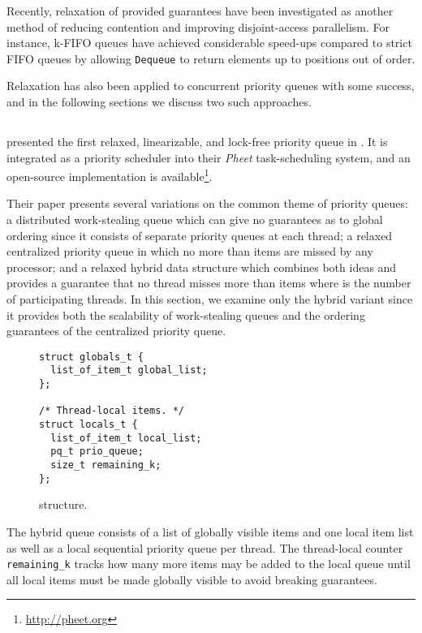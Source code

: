 \documentclass[a4paper,10pt]{article}
\begin{document}
Recently, relaxation of provided guarantees have been investigated as another method of reducing
contention and improving disjoint-access parallelism.
For instance, k-FIFO queues \cite{kirsch2012fast} have achieved considerable
speed-ups compared to strict FIFO queues by allowing {\lstset{breaklines,breakatwhitespace} \lstinline|Dequeue|} to return elements
up to  positions out of order.

Relaxation has also been applied to concurrent priority queues with some success, and in the following
sections we discuss two such approaches.

\subsection{\citeauthor{wimmer2013data}} \label{sec:wimmer}

\citeauthor{wimmer2013data} presented the first relaxed, linearizable, and lock-free priority queue
in \cite{wimmer2013data}. It is integrated as a priority scheduler into their \emph{Pheet} task-scheduling
system, and an open-source implementation is available\footnote{\url{http://pheet.org}}.

Their paper presents several variations on the common theme of priority queues: a distributed work-stealing
queue which can give no guarantees as to global ordering since it consists of separate priority queues
at each thread; a relaxed centralized priority queue in which no more than  items are missed
by any processor; and a relaxed hybrid data structure which combines both ideas and provides
a guarantee that no thread misses more than  items where  is the number of participating threads.
In this section, we examine only the hybrid variant since it provides both the scalability of work-stealing
queues and the ordering guarantees of the centralized priority queue.

\begin{figure}[ht]
\begin{lstlisting}
struct globals_t {
  list_of_item_t global_list;
};

/* Thread-local items. */
struct locals_t {
  list_of_item_t local_list;
  pq_t prio_queue;
  size_t remaining_k;
};
\end{lstlisting}
\caption{\citeauthor{wimmer2013data} structure.}
\label{fig:wimmerq}
\end{figure}

The hybrid queue consists of a list of globally visible items and one local item list as well as a local
sequential priority queue per thread. The thread-local counter \lstinline|remaining_k| tracks how many more
items may be added to the local queue until all local items must be made globally visible to avoid
breaking guarantees.
\end{document}
